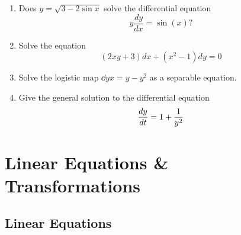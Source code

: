 \documentclass[10pt,driverfallback=hypertex]{report}
\begin{document}
\begin{enumerate}
\item
  Does $y = \sqrt{3-2\sin x}$ solve the differential equation
  \begin{dmath*}
    y\frac{dy}{dx}=\sin(x)?
  \end{dmath*}

\item
  Solve the equation
  \begin{dmath*}
    (2xy + 3) dx + (x^2 - 1) dy = 0
  \end{dmath*}

\item
  Solve the logistic map $\dd{y}{x} = y - y^2$ as a separable equation.

\item
  Give the general solution to the differential equation
  \begin{dmath*}
    \ddt{y} = 1 + \frac{1}{y^2}
  \end{dmath*}

\end{enumerate}



\chapter{Linear Equations \& Transformations}

\section{Linear Equations}
\end{document}
